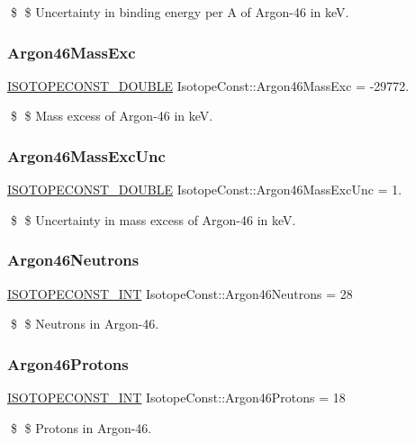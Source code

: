\$ \$ Uncertainty in binding energy per A of Argon-\/46 in keV. \mbox{\label{group___isotope_const-_argon-_ar46_ga8afa5fbea6757dc46f102deca51192e2}} 
\subsubsection{\texorpdfstring{Argon46\+Mass\+Exc}{Argon46MassExc}}
{\footnotesize\ttfamily \mbox{\hyperlink{group___isotope_const-_macros_ga8f45a7272ce02c0b4c65c44636ed719a}{I\+S\+O\+T\+O\+P\+E\+C\+O\+N\+S\+T\+\_\+\+D\+O\+U\+B\+LE}} Isotope\+Const\+::\+Argon46\+Mass\+Exc = -\/29772.}

\$ \$ Mass excess of Argon-\/46 in keV. \mbox{\label{group___isotope_const-_argon-_ar46_gac2401e1780f91c360b873f9777da5436}} 
\subsubsection{\texorpdfstring{Argon46\+Mass\+Exc\+Unc}{Argon46MassExcUnc}}
{\footnotesize\ttfamily \mbox{\hyperlink{group___isotope_const-_macros_ga8f45a7272ce02c0b4c65c44636ed719a}{I\+S\+O\+T\+O\+P\+E\+C\+O\+N\+S\+T\+\_\+\+D\+O\+U\+B\+LE}} Isotope\+Const\+::\+Argon46\+Mass\+Exc\+Unc = 1.}

\$ \$ Uncertainty in mass excess of Argon-\/46 in keV. \mbox{\label{group___isotope_const-_argon-_ar46_gae61ef23ba97cb20e512fe8812488b356}} 
\subsubsection{\texorpdfstring{Argon46\+Neutrons}{Argon46Neutrons}}
{\footnotesize\ttfamily \mbox{\hyperlink{group___isotope_const-_macros_ga5f18360b3e99483a35c32d789e62621c}{I\+S\+O\+T\+O\+P\+E\+C\+O\+N\+S\+T\+\_\+\+I\+NT}} Isotope\+Const\+::\+Argon46\+Neutrons = 28}

\$ \$ Neutrons in Argon-\/46. \mbox{\label{group___isotope_const-_argon-_ar46_ga40b11f20c995424412ab64a938afde90}} 
\subsubsection{\texorpdfstring{Argon46\+Protons}{Argon46Protons}}
{\footnotesize\ttfamily \mbox{\hyperlink{group___isotope_const-_macros_ga5f18360b3e99483a35c32d789e62621c}{I\+S\+O\+T\+O\+P\+E\+C\+O\+N\+S\+T\+\_\+\+I\+NT}} Isotope\+Const\+::\+Argon46\+Protons = 18}

\$ \$ Protons in Argon-\/46. 